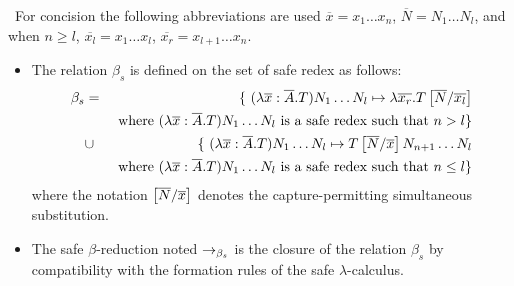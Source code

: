 \begin{dfn} \
For concision the following abbreviations are used $\overline{x} = x_1 \ldots
x_n$, $\overline{N} = N_1 \ldots N_l$, and when $n\geq l$, $\overline{x_l} = x_1 \ldots
x_l$, $\overline{x_r} = x_{l+1} \ldots x_n$.
\begin{itemize}
\item The relation $\beta_s$ is defined on the set of safe redex as follows:
\begin{eqnarray*}
\beta_s &=&
\{  \ (\lambda \overline{x} : \overline{A} . T) N_1 \ldots N_l \mapsto \lambda \overline{x_r}. T\left[ \overline{N}/\overline{x_l} \right]  \\
&& \mbox{ where $(\lambda \overline{x} : \overline{A} . T) N_1 \ldots N_l$ is a safe redex such that $n> l$}
\} \\
&\cup&
\{ \ (\lambda \overline{x} : \overline{A} . T) N_1 \ldots N_l \mapsto T\left[ \overline{N}/\overline{x} \right] N_{n+1} \ldots N_l  \\
&& \mbox{ where $(\lambda \overline{x} : \overline{A} . T) N_1 \ldots N_l$ is a safe redex such that $n\leq l$}
\}
\end{eqnarray*}
where the notation $\left[ \overline{N}/\overline{x} \right]$ denotes the capture-permitting simultaneous substitution.

\item
The safe $\beta$-reduction noted $\rightarrow_{\beta_s}$ is the closure
of the relation $\beta_s$ by compatibility with the formation rules
of the safe $\lambda$-calculus.
\end{itemize}
\end{dfn}



